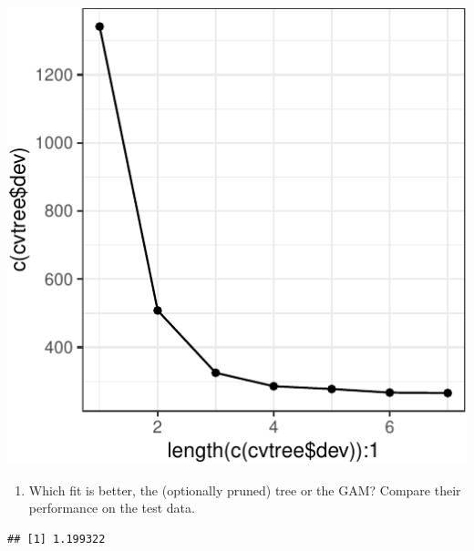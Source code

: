 \documentclass[]{article}
\newenvironment{Shaded}{\begin{snugshade}}{\end{snugshade}}
\newcommand{\DecValTok}[1]{\textcolor[rgb]{0.00,0.00,0.81}{#1}}
\newcommand{\KeywordTok}[1]{\textcolor[rgb]{0.13,0.29,0.53}{\textbf{#1}}}
\newcommand{\NormalTok}[1]{#1}
\newcommand{\OperatorTok}[1]{\textcolor[rgb]{0.81,0.36,0.00}{\textbf{#1}}}
\newcommand{\StringTok}[1]{\textcolor[rgb]{0.31,0.60,0.02}{#1}}
\providecommand{\tightlist}{%
  \setlength{\itemsep}{0pt}\setlength{\parskip}{0pt}}
\begin{document}
\begin{center}\includegraphics{sol_A4_files/figure-latex/unnamed-chunk-12-1} \end{center}

\begin{enumerate}
\def\labelenumi{(\alph{enumi})}
\setcounter{enumi}{2}
\tightlist
\item
  Which fit is better, the (optionally pruned) tree or the GAM? Compare
  their performance on the test data.
\end{enumerate}

\begin{Shaded}
\end{Shaded}

\begin{verbatim}
## [1] 1.199322
\end{verbatim}

\begin{Shaded}
\end{Shaded}
\end{document}
